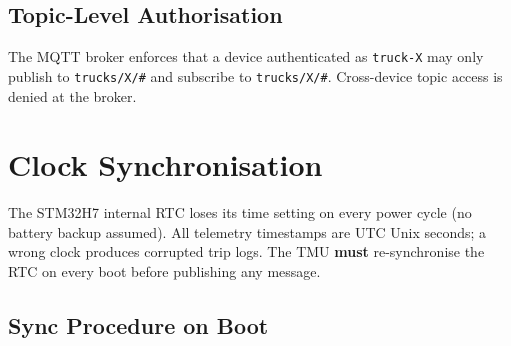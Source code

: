 \documentclass{article}
\begin{document}
\subsection{Topic-Level Authorisation}

The MQTT broker enforces that a device authenticated as \texttt{truck-X} may
only publish to \texttt{trucks/X/\#} and subscribe to \texttt{trucks/X/\#}.
Cross-device topic access is denied at the broker.

\section{Clock Synchronisation}
\label{sec:clock-sync}

The STM32H7 internal RTC loses its time setting on every power cycle (no
battery backup assumed). All telemetry timestamps are UTC Unix seconds; a wrong
clock produces corrupted trip logs. The TMU \textbf{must} re-synchronise the
RTC on every boot before publishing any message.

\subsection{Sync Procedure on Boot}
\end{document}
